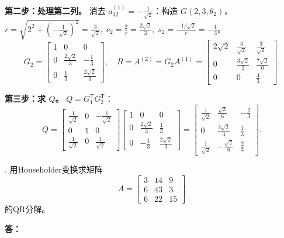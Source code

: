 \documentclass{article}
\begin{document}
\textbf{第二步：处理第二列。}
消去 $a_{32}^{(1)}=-\frac{1}{\sqrt{2}}$：构造 $G(2,3,\theta_2)$，
$r=\sqrt{2^2+(-\frac{1}{\sqrt{2}})^2}=\frac{3}{\sqrt{2}},\;
c_2=\frac{2}{r}=\frac{2\sqrt{2}}{3},\;s_2=\frac{-1/\sqrt{2}}{r}=-\frac{1}{3}$。
\[
G_2=\begin{bmatrix}
1 & 0 & 0\\[4pt]
0 & \frac{2\sqrt{2}}{3} & -\frac{1}{3}\\[4pt]
0 & \frac{1}{3} & \frac{2\sqrt{2}}{3}
\end{bmatrix},\quad
R=A^{(2)}=G_2A^{(1)}=\begin{bmatrix}
2\sqrt{2} & \frac{3}{\sqrt{2}} & \frac{3}{\sqrt{2}}\\[4pt]
0 & \frac{3\sqrt{2}}{2} & \frac{7\sqrt{2}}{6}\\[4pt]
0 & 0 & \frac{4}{3}
\end{bmatrix}.
\]

\textbf{第三步：求 $Q$。}
$Q=G_1^{\mathsf T}G_2^{\mathsf T}$：
\[
Q = \begin{bmatrix}
\frac{1}{\sqrt{2}} & 0 & -\frac{1}{\sqrt{2}}\\[4pt]
0 & 1 & 0\\[4pt]
\frac{1}{\sqrt{2}} & 0 & \frac{1}{\sqrt{2}}
\end{bmatrix}
\begin{bmatrix}
1 & 0 & 0\\[4pt]
0 & \frac{2\sqrt{2}}{3} & \frac{1}{3}\\[4pt]
0 & -\frac{1}{3} & \frac{2\sqrt{2}}{3}
\end{bmatrix}
= \begin{bmatrix}
\frac{1}{\sqrt{2}} & \frac{\sqrt{2}}{6} & -\frac{2}{3}\\[4pt]
0 & \frac{2\sqrt{2}}{3} & \frac{1}{3}\\[4pt]
\frac{1}{\sqrt{2}} & -\frac{\sqrt{2}}{6} & \frac{2}{3}
\end{bmatrix}.
\]
\newpage

. 用Householder变换求矩阵
\[
A=\begin{bmatrix}
3 & 14 & 9 \\
6 & 43 & 3 \\
6 & 22 & 15
\end{bmatrix}
\]
的QR分解。

\noindent \textbf{答：}
\end{document}

